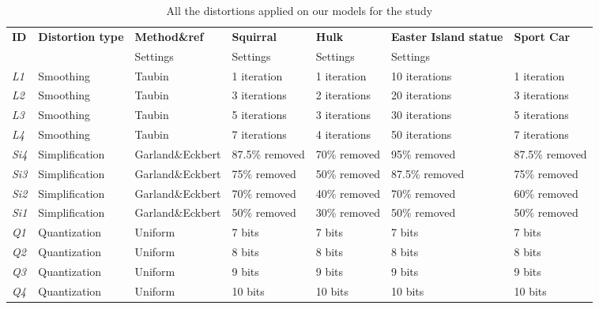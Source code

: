 \begin{table}[]
\centering
\caption{All the distortions applied on our models for the study}
\label{my-label}
\begin{tabular}{lllllll}
\textbf{ID} & \textbf{Distortion type} & \textbf{Method\&ref}        & \textbf{Squirral }      & \textbf{Hulk }        & \textbf{Easter Island statue} & \textbf{Sport Car }    \\
                &                        & Settings       & Settings     & Settings             & Settings       \\
\textit{L1} & Smoothing       & Taubin              & 1 iteration    & 1 iteration  & 10 iterations        & 1 iteration    \\
\textit{L2} & Smoothing       & Taubin              & 3 iterations   & 2 iterations & 20 iterations        & 3 iterations   \\
\textit{L3} & Smoothing       & Taubin              & 5 iterations   & 3 iterations & 30 iterations        & 5 iterations   \\
\textit{L4} & Smoothing       & Taubin              & 7 iterations   & 4 iterations & 50 iterations        & 7 iterations   \\
\textit{Si4} & Simplification  & Garland\&Eckbert \cite{Garland_1997}       & 87.5\% removed & 70\% removed & 95\% removed         & 87.5\% removed \\
\textit{Si3} & Simplification  & Garland\&Eckbert \cite{Garland_1997}       & 75\% removed   & 50\% removed & 87.5\% removed       & 75\% removed   \\
\textit{Si2} & Simplification  & Garland\&Eckbert \cite{Garland_1997}        & 70\% removed   & 40\% removed & 70\% removed         & 60\% removed   \\
\textit{Si1} & Simplification  & Garland\&Eckbert \cite{Garland_1997}       & 50\% removed   & 30\% removed & 50\% removed         & 50\% removed   \\
\textit{Q1 }& Quantization    & Uniform                & 7 bits         & 7 bits       & 7 bits               & 7 bits         \\
\textit{Q2} & Quantization    & Uniform                & 8 bits         & 8 bits       & 8 bits               & 8 bits         \\
\textit{Q3} & Quantization    & Uniform                & 9 bits         & 9 bits       & 9 bits               & 9 bits         \\
\textit{Q4} & Quantization    & Uniform                & 10 bits        & 10 bits      & 10 bits              & 10 bits        \\

\end{tabular}
\end{table}
